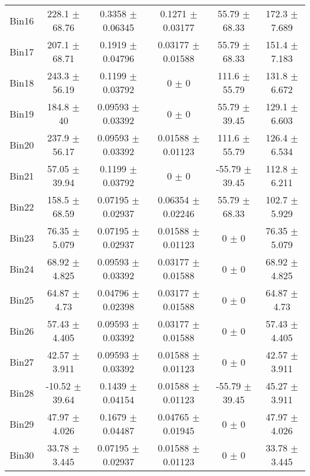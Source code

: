 \begin{tabular}{@{\extracolsep{4pt}}lccccc@{}}
     Bin16 & 228.1 $\pm$ 68.76 & 0.3358 $\pm$ 0.06345 & 0.1271 $\pm$ 0.03177 & 55.79 $\pm$ 68.33 & 172.3 $\pm$ 7.689 \\ 
     Bin17 & 207.1 $\pm$ 68.71 & 0.1919 $\pm$ 0.04796 & 0.03177 $\pm$ 0.01588 & 55.79 $\pm$ 68.33 & 151.4 $\pm$ 7.183 \\ 
     Bin18 & 243.3 $\pm$ 56.19 & 0.1199 $\pm$ 0.03792 & 0 $\pm$ 0 & 111.6 $\pm$ 55.79 & 131.8 $\pm$ 6.672 \\ 
     Bin19 & 184.8 $\pm$ 40 & 0.09593 $\pm$ 0.03392 & 0 $\pm$ 0 & 55.79 $\pm$ 39.45 & 129.1 $\pm$ 6.603 \\ 
     Bin20 & 237.9 $\pm$ 56.17 & 0.09593 $\pm$ 0.03392 & 0.01588 $\pm$ 0.01123 & 111.6 $\pm$ 55.79 & 126.4 $\pm$ 6.534 \\ 
     Bin21 & 57.05 $\pm$ 39.94 & 0.1199 $\pm$ 0.03792 & 0 $\pm$ 0 & -55.79 $\pm$ 39.45 & 112.8 $\pm$ 6.211 \\ 
     Bin22 & 158.5 $\pm$ 68.59 & 0.07195 $\pm$ 0.02937 & 0.06354 $\pm$ 0.02246 & 55.79 $\pm$ 68.33 & 102.7 $\pm$ 5.929 \\ 
     Bin23 & 76.35 $\pm$ 5.079 & 0.07195 $\pm$ 0.02937 & 0.01588 $\pm$ 0.01123 & 0 $\pm$ 0 & 76.35 $\pm$ 5.079 \\ 
     Bin24 & 68.92 $\pm$ 4.825 & 0.09593 $\pm$ 0.03392 & 0.03177 $\pm$ 0.01588 & 0 $\pm$ 0 & 68.92 $\pm$ 4.825 \\ 
     Bin25 & 64.87 $\pm$ 4.73 & 0.04796 $\pm$ 0.02398 & 0.03177 $\pm$ 0.01588 & 0 $\pm$ 0 & 64.87 $\pm$ 4.73 \\ 
     Bin26 & 57.43 $\pm$ 4.405 & 0.09593 $\pm$ 0.03392 & 0.03177 $\pm$ 0.01588 & 0 $\pm$ 0 & 57.43 $\pm$ 4.405 \\ 
     Bin27 & 42.57 $\pm$ 3.911 & 0.09593 $\pm$ 0.03392 & 0.01588 $\pm$ 0.01123 & 0 $\pm$ 0 & 42.57 $\pm$ 3.911 \\ 
     Bin28 & -10.52 $\pm$ 39.64 & 0.1439 $\pm$ 0.04154 & 0.01588 $\pm$ 0.01123 & -55.79 $\pm$ 39.45 & 45.27 $\pm$ 3.911 \\ 
     Bin29 & 47.97 $\pm$ 4.026 & 0.1679 $\pm$ 0.04487 & 0.04765 $\pm$ 0.01945 & 0 $\pm$ 0 & 47.97 $\pm$ 4.026 \\ 
     Bin30 & 33.78 $\pm$ 3.445 & 0.07195 $\pm$ 0.02937 & 0.01588 $\pm$ 0.01123 & 0 $\pm$ 0 & 33.78 $\pm$ 3.445 \\ 
\hline\hline
  \end{tabular}
